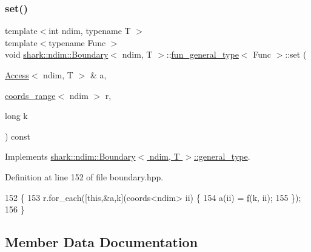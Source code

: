 \subsubsection{\texorpdfstring{set()}{set()}}
{\footnotesize\ttfamily template$<$int ndim, typename T $>$ \\
template$<$typename Func $>$ \\
void \hyperlink{classshark_1_1ndim_1_1_boundary}{shark\+::ndim\+::\+Boundary}$<$ ndim, T $>$\+::\hyperlink{classshark_1_1ndim_1_1_boundary_1_1fun__general__type}{fun\+\_\+general\+\_\+type}$<$ Func $>$\+::set (\begin{DoxyParamCaption}\item[{\hyperlink{classshark_1_1ndim_1_1_access}{Access}$<$ ndim, T $>$ \&}]{a,  }\item[{\hyperlink{structshark_1_1ndim_1_1coords__range}{coords\+\_\+range}$<$ ndim $>$}]{r,  }\item[{long}]{k }\end{DoxyParamCaption}) const\hspace{0.3cm}{\ttfamily [virtual]}}



Implements \hyperlink{classshark_1_1ndim_1_1_boundary_1_1general__type_ac73340187c707591d7fc1ccbe85c1b19}{shark\+::ndim\+::\+Boundary$<$ ndim, T $>$\+::general\+\_\+type}.



Definition at line 152 of file boundary.\+hpp.


\begin{DoxyCode}
152                                                                                                            
         \{
153             r.for\_each([\textcolor{keyword}{this},&a,k](coords<ndim> ii) \{
154                 a(ii) = \hyperlink{classshark_1_1ndim_1_1_boundary_1_1fun__general__type_a7a2449e92b694dd4d966e17c4d999a91}{f}(k, ii);
155             \});
156         \}
\end{DoxyCode}


\subsection{Member Data Documentation}
\hypertarget{classshark_1_1ndim_1_1_boundary_1_1fun__general__type_a7a2449e92b694dd4d966e17c4d999a91}{}\label{classshark_1_1ndim_1_1_boundary_1_1fun__general__type_a7a2449e92b694dd4d966e17c4d999a91} 
